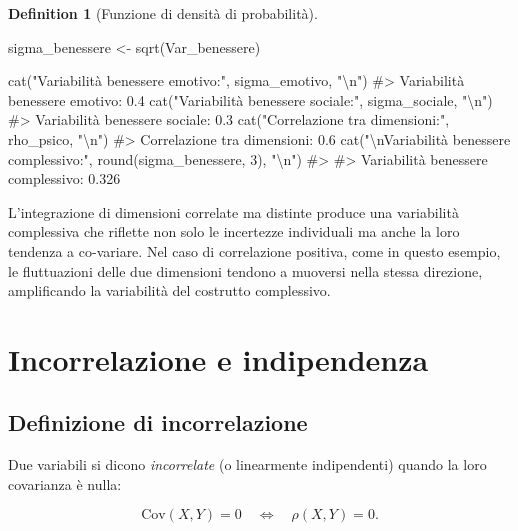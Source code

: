 \documentclass[
  letterpaper,
  DIV=11,
  numbers=noendperiod,
  oneside]{scrreprt}
\newenvironment{Shaded}{\begin{snugshade}}{\end{snugshade}}
\newcommand{\CommentTok}[1]{\textcolor[rgb]{0.37,0.37,0.37}{#1}}
\newcommand{\DecValTok}[1]{\textcolor[rgb]{0.68,0.00,0.00}{#1}}
\newcommand{\FunctionTok}[1]{\textcolor[rgb]{0.28,0.35,0.67}{#1}}
\newcommand{\NormalTok}[1]{\textcolor[rgb]{0.00,0.23,0.31}{#1}}
\newcommand{\OtherTok}[1]{\textcolor[rgb]{0.00,0.23,0.31}{#1}}
\newcommand{\SpecialCharTok}[1]{\textcolor[rgb]{0.37,0.37,0.37}{#1}}
\newcommand{\StringTok}[1]{\textcolor[rgb]{0.13,0.47,0.30}{#1}}
\theoremstyle{definition}
\theoremstyle{plain}
\theoremstyle{definition}
\newtheorem{definition}{Definition}[chapter]
\theoremstyle{remark}
\begin{document}
\begin{definition}[Funzione di densità di
probabilità]
\begin{Shaded}
\begin{Highlighting}[]
\NormalTok{sigma\_benessere }\OtherTok{\textless{}{-}} \FunctionTok{sqrt}\NormalTok{(Var\_benessere)}

\FunctionTok{cat}\NormalTok{(}\StringTok{"Variabilità benessere emotivo:"}\NormalTok{, sigma\_emotivo, }\StringTok{"}\SpecialCharTok{\textbackslash{}n}\StringTok{"}\NormalTok{)}
\CommentTok{\#\textgreater{} Variabilità benessere emotivo: 0.4}
\FunctionTok{cat}\NormalTok{(}\StringTok{"Variabilità benessere sociale:"}\NormalTok{, sigma\_sociale, }\StringTok{"}\SpecialCharTok{\textbackslash{}n}\StringTok{"}\NormalTok{)}
\CommentTok{\#\textgreater{} Variabilità benessere sociale: 0.3}
\FunctionTok{cat}\NormalTok{(}\StringTok{"Correlazione tra dimensioni:"}\NormalTok{, rho\_psico, }\StringTok{"}\SpecialCharTok{\textbackslash{}n}\StringTok{"}\NormalTok{)}
\CommentTok{\#\textgreater{} Correlazione tra dimensioni: 0.6}
\FunctionTok{cat}\NormalTok{(}\StringTok{"}\SpecialCharTok{\textbackslash{}n}\StringTok{Variabilità benessere complessivo:"}\NormalTok{, }\FunctionTok{round}\NormalTok{(sigma\_benessere, }\DecValTok{3}\NormalTok{), }\StringTok{"}\SpecialCharTok{\textbackslash{}n}\StringTok{"}\NormalTok{)}
\CommentTok{\#\textgreater{} }
\CommentTok{\#\textgreater{} Variabilità benessere complessivo: 0.326}
\end{Highlighting}
\end{Shaded}

L'integrazione di dimensioni correlate ma distinte produce una
variabilità complessiva che riflette non solo le incertezze individuali
ma anche la loro tendenza a co-variare. Nel caso di correlazione
positiva, come in questo esempio, le fluttuazioni delle due dimensioni
tendono a muoversi nella stessa direzione, amplificando la variabilità
del costrutto complessivo.

\section{Incorrelazione e
indipendenza}\label{incorrelazione-e-indipendenza}

\subsection{Definizione di
incorrelazione}\label{definizione-di-incorrelazione}

Due variabili si dicono \emph{incorrelate} (o linearmente indipendenti)
quando la loro covarianza è nulla:

\[
\text{Cov}(X, Y) = 0 \quad \Leftrightarrow \quad \rho(X, Y) = 0.
\]


\end{definition}
\end{document}
